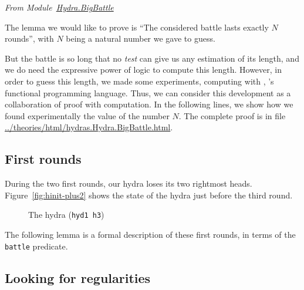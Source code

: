 \emph{From Module~\href{../theories/html/hydras.Hydra.BigBattle.html}{Hydra.BigBattle}}




The lemma we would like to prove is ``The considered battle lasts exactly $N$ rounds'',
with $N$ being a natural number we gave to guess.

But the  battle is so long that no \emph{test} can give us any estimation of its length, and we do need the expressive power of logic to compute this length. However, in order to  guess this length, we made some experiments, computing with \gallina{}, \coq{}'s  functional programming language.
Thus, we can consider this development as a collaboration of proof with computation.
In the following lines, we show how we found experimentally the value of the number $N$.
The complete proof is in file \url{../theories/html/hydras.Hydra.BigBattle.html}. 

\subsection{First rounds}
During the two first rounds, our hydra loses its two rightmost heads.  Figure~\vref{fig:hinit-plus2} shows the state of the hydra   just before the third round.


\begin{figure}[h]
  \centering

  \caption{The hydra (\texttt{hyd1 h3})}
  \label{fig:hinit-plus2}
\end{figure}

The following lemma  is a formal description of these first rounds, in terms of the
\texttt{battle} predicate.





\subsection{Looking for regularities}


